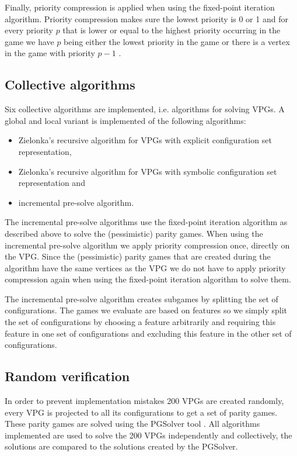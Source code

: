 Finally, priority compression is applied when using the fixed-point iteration algorithm. Priority compression makes sure the lowest priority is 0 or 1 and for every priority $p$ that is lower or equal to the highest priority occurring in the game we have $p$ being either the lowest priority in the game or there is a vertex in the game with priority $p-1$ \cite{FPITE,friedmanPG}.

\subsection{Collective algorithms}
Six collective algorithms are implemented, i.e. algorithms for solving VPGs. A global and local variant is implemented of the following algorithms:
\begin{itemize}
	\item Zielonka's recursive algorithm for VPGs with explicit configuration set representation,
	\item Zielonka's recursive algorithm for VPGs with symbolic configuration set representation and
	\item incremental pre-solve algorithm.
\end{itemize}
The incremental pre-solve algorithms use the fixed-point iteration algorithm as described above to solve the (pessimistic) parity games. When using the incremental pre-solve algorithm we apply priority compression once, directly on the VPG. Since the (pessimistic) parity games that are created during the algorithm have the same vertices as the VPG we do not have to apply priority compression again when using the fixed-point iteration algorithm to solve them.

The incremental pre-solve algorithm creates subgames by splitting the set of configurations. The games we evaluate are based on features so we simply split the set of configurations by choosing a feature arbitrarily and requiring this feature in one set of configurations and excluding this feature in the other set of configurations.
\subsection{Random verification}
In order to prevent implementation mistakes 200 VPGs are created randomly, every VPG is projected to all its configurations to get a set of parity games. These parity games are solved using the PGSolver tool \cite{Friedmann2010ThePC}. All algorithms implemented are used to solve the 200 VPGs independently and collectively, the solutions are compared to the solutions created by the PGSolver.